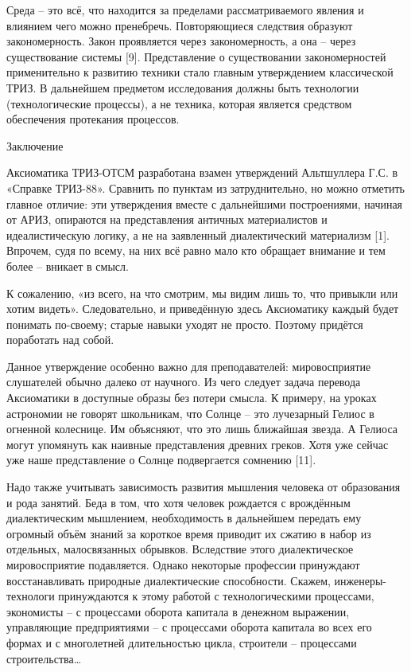\documentclass[11pt,a4paper]{article}
\begin{document}
Среда – это всё, что находится за пределами рассматриваемого явления и влиянием чего можно пренебречь. Повторяющиеся следствия образуют закономерность. Закон проявляется через закономерность, а она – через существование системы [9]. Представление о существовании закономерностей применительно к развитию техники стало главным утверждением классической ТРИЗ. В дальнейшем предметом исследования должны быть технологии (технологические процессы), а не техника, которая является средством обеспечения протекания процессов.

 

 

Заключение

 

Аксиоматика ТРИЗ-ОТСМ разработана взамен утверждений Альтшуллера Г.С. в «Справке ТРИЗ-88». Сравнить по пунктам из затруднительно, но можно отметить главное отличие: эти утверждения вместе с дальнейшими построениями, начиная от АРИЗ, опираются на представления античных материалистов и идеалистическую логику, а не на заявленный диалектический материализм [1]. Впрочем, судя по всему, на них всё равно мало кто обращает внимание и тем более – вникает в смысл.

К сожалению, «из всего, на что смотрим, мы видим лишь то, что привыкли или хотим видеть». Следовательно, и приведённую здесь Аксиоматику каждый будет понимать по-своему; старые навыки уходят не просто. Поэтому придётся поработать над собой.

Данное утверждение особенно важно для преподавателей: мировосприятие слушателей обычно далеко от научного. Из чего следует задача перевода Аксиоматики в доступные образы без потери смысла. К примеру, на уроках астрономии не говорят школьникам, что Солнце – это лучезарный Гелиос в огненной колеснице. Им объясняют, что это лишь ближайшая звезда. А Гелиоса могут упомянуть как наивные представления древних греков. Хотя уже сейчас уже наше представление о Солнце подвергается сомнению [11].

Надо также учитывать зависимость развития мышления человека от образования и рода занятий. Беда в том, что хотя человек рождается с врождённым диалектическим мышлением, необходимость в дальнейшем передать ему огромный объём знаний за короткое время приводит их сжатию в набор из отдельных, малосвязанных обрывков. Вследствие этого диалектическое мировосприятие подавляется. Однако некоторые профессии принуждают восстанавливать природные диалектические способности. Скажем, инженеры-технологи принуждаются к этому работой с технологическими процессами, экономисты – с процессами оборота капитала в денежном выражении, управляющие предприятиями – с процессами оборота капитала во всех его формах и с многолетней длительностью цикла, строители – процессами строительства…
\end{document}
